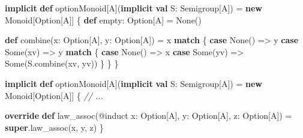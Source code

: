 \documentclass[
  ignorenonframetext,
]{beamer}
\newenvironment{Shaded}{}{}
\newcommand{\CommentTok}[1]{\textcolor[rgb]{0.38,0.63,0.69}{\textit{#1}}}
\newcommand{\FunctionTok}[1]{\textcolor[rgb]{0.02,0.16,0.49}{#1}}
\newcommand{\KeywordTok}[1]{\textcolor[rgb]{0.00,0.44,0.13}{\textbf{#1}}}
\newcommand{\NormalTok}[1]{#1}
\begin{document}
\begin{frame}[fragile]

\begin{Shaded}
\begin{Highlighting}[]
\KeywordTok{implicit} \KeywordTok{def}\NormalTok{ optionMonoid[A](}\KeywordTok{implicit} \KeywordTok{val}\NormalTok{ S: Semigroup[A]) =}
  \KeywordTok{new}\NormalTok{ Monoid[Option[A]] \{}
    \KeywordTok{def}\NormalTok{ empty: Option[A] = None()}

    \KeywordTok{def} \FunctionTok{combine}\NormalTok{(x: Option[A], y: Option[A]) =}
\NormalTok{      x }\KeywordTok{match}\NormalTok{ \{}
        \KeywordTok{case}\NormalTok{ None()   => y}
        \KeywordTok{case}\NormalTok{ Some(xv) => y }\KeywordTok{match}\NormalTok{ \{}
          \KeywordTok{case}\NormalTok{ None()   => x}
          \KeywordTok{case}\NormalTok{ Some(yv) => Some(S.}\FunctionTok{combine}\NormalTok{(xv, yv))}
\NormalTok{        \}}
\NormalTok{      \}}
\NormalTok{  \}}
\end{Highlighting}
\end{Shaded}

\end{frame}

\begin{frame}[fragile]

\begin{Shaded}
\begin{Highlighting}[]
\KeywordTok{implicit} \KeywordTok{def}\NormalTok{ optionMonoid[A](}\KeywordTok{implicit} \KeywordTok{val}\NormalTok{ S: Semigroup[A]) =}
  \KeywordTok{new}\NormalTok{ Monoid[Option[A]] \{}
    \CommentTok{// ...}

    \KeywordTok{override} \KeywordTok{def} \FunctionTok{law_assoc}\NormalTok{(@induct x: Option[A], y: Option[A], z: Option[A]) =}
      \KeywordTok{super}\NormalTok{.}\FunctionTok{law_assoc}\NormalTok{(x, y, z)}
\NormalTok{  \}}
\end{Highlighting}
\end{Shaded}

\end{frame}
\end{document}
